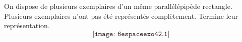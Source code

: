 On dispose de plusieurs exemplaires d'un même parallélépipède
rectangle.
Plusieurs exemplaires n'ont pas été représentés complètement. Termine
leur représentation.
\[\texttt{[image: 6espaceexo42.1]}\]